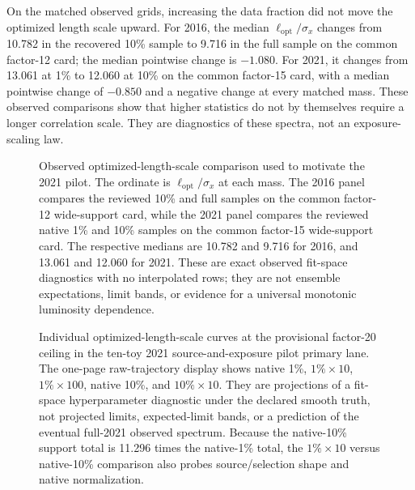 {On the matched observed grids, increasing the data fraction did not move the optimized
length scale upward. For 2016, the median
$\ell_{\mathrm{opt}}/\sigma_x$ changes from 10.782 in the recovered 10\% sample to
9.716 in the full sample on the common factor-12 card; the median pointwise change is
$-1.080$. For 2021, it changes from 13.061 at 1\% to 12.060 at 10\% on the common
factor-15 card, with a median pointwise change of $-0.850$ and a negative change at
every matched mass. These observed comparisons show that higher statistics do not by
themselves require a longer correlation scale. They are diagnostics of these spectra,
not an exposure-scaling law.

\begin{figure}[H]
\centering
{}
\caption{Observed optimized-length-scale comparison used to motivate the 2021 pilot.
The ordinate is $\ell_{\mathrm{opt}}/\sigma_x$ at each mass. The 2016 panel compares
the reviewed 10\% and full samples on the common factor-12 wide-support card, while the
2021 panel compares the reviewed native 1\% and 10\% samples on the common factor-15
wide-support card. The respective medians are 10.782 and 9.716 for 2016, and
13.061 and 12.060 for 2021. These are exact observed fit-space diagnostics with no
interpolated rows; they are not ensemble expectations, limit bands, or evidence for
a universal monotonic luminosity dependence.}
\label{fig:v4p1-ls-observed-dataset-comparison}
\end{figure}

\begin{figure}[H]
\centering
{}
\caption{Individual optimized-length-scale curves at the provisional factor-20
ceiling in the ten-toy 2021 source-and-exposure pilot primary lane. The one-page
raw-trajectory display shows native 1\%,
$1\%\times10$, $1\%\times100$, native 10\%, and $10\%\times10$. They are
projections of a fit-space hyperparameter diagnostic under the declared smooth truth,
not projected limits, expected-limit bands, or a prediction of the eventual full-2021
observed spectrum. Because the native-10\% support total is 11.296 times the
native-1\% total, the $1\%\times10$ versus native-10\% comparison also probes
source/selection shape and native normalization.}
\label{fig:v4p1-ls-toy-ensemble-curves}
\end{figure}

}
